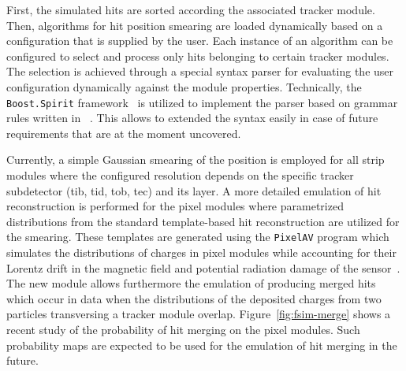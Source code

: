 
First, the simulated hits are sorted according the associated tracker module. Then, algorithms for hit position smearing are loaded dynamically based on a configuration that is supplied by the user. Each instance of an algorithm can be configured to select and process only hits belonging to certain tracker modules. The selection is achieved through a special syntax parser for evaluating the user configuration dynamically against the module properties. Technically, the \texttt{Boost.Spirit} framework~\cite{boostspirit} is utilized to implement the parser based on grammar rules written in ~\cite{ebnf}. This allows to extended the syntax easily in case of future requirements that are at the moment uncovered.

Currently, a simple Gaussian smearing of the position is employed for all strip modules where the configured resolution depends on the specific tracker subdetector (\gls{tib}, \gls{tid}, \gls{tob}, \gls{tec}) and its layer. A more detailed emulation of hit reconstruction is performed for the pixel modules where parametrized distributions from the standard template-based hit reconstruction are utilized for the smearing. These templates are generated using the \texttt{PixelAV} program which simulates the distributions of charges in pixel modules while accounting for their Lorentz drift in the magnetic field and potential radiation damage of the sensor~\cite{Swartz:2002kda}. The new \FSIM module allows furthermore the emulation of producing merged hits which occur in data when the distributions of the deposited charges from two particles transversing a tracker module overlap. Figure~\ref{fig:fsim-merge} shows a recent study of the probability of hit merging on the pixel modules. Such probability maps are expected to be used for the emulation of hit merging in the future.


